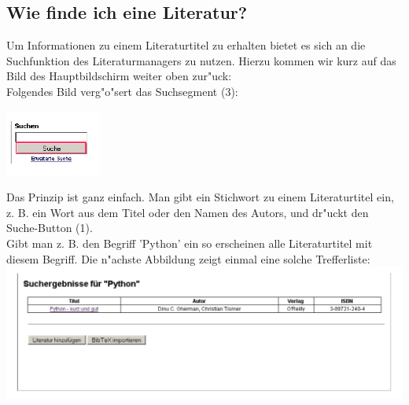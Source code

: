 \subsection{Wie finde ich eine Literatur?}
Um Informationen zu einem Literaturtitel zu erhalten bietet es sich an die Suchfunktion des Literaturmanagers zu nutzen. Hierzu kommen wir kurz auf das Bild des Hauptbildschirm weiter oben zur"uck:\\
Folgendes Bild verg"o"sert das Suchsegment (3):\\
\begin{center}
\includegraphics[scale=2.0]{suche}\\
\end{center}
Das Prinzip ist ganz einfach. Man gibt ein Stichwort zu einem Literaturtitel ein, z. B. ein Wort aus dem Titel oder den Namen des Autors, und dr"uckt den Suche-Button (1).\\
Gibt man z. B. den Begriff 'Python' ein so erscheinen alle Literaturtitel mit diesem Begriff. Die n"achste Abbildung zeigt einmal eine solche Trefferliste:\\
\includegraphics[scale=0.8]{treffer}\\

